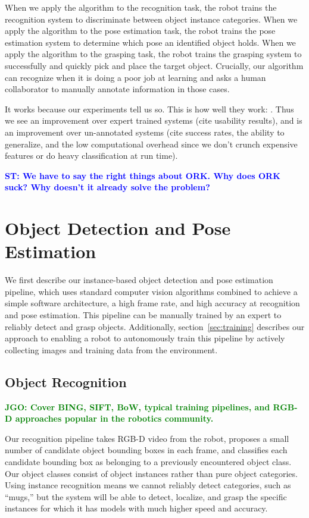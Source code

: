 \documentclass[conference]{IEEEtran}
\newcommand{\stnote}[1]{\textcolor{blue}{\textbf{ST: #1}}}
\newcommand{\jgonote}[1]{\textcolor{green}{\textbf{JGO: #1}}}
\begin{document}
When we apply the algorithm to the recognition task, the robot trains
the recognition system to discriminate between object instance
categories. When we apply the algorithm to the pose estimation task,
the robot trains the pose estimation system to determine which pose an
identified object holds.  When we apply the algorithm to the grasping
task, the robot trains the grasping system to successfully and quickly
pick and place the target object.  Crucially, our algorithm can
recognize when it is doing a poor job at learning and asks a human
collaborator to manually annotate information in those cases.



It works because our experiments tell us so. This is how well they
work: .  Thus we see an improvement over expert trained systems (cite
usability results), and is an improvement over un-annotated systems
(cite success rates, the ability to generalize, and the low
computational overhead since we don't crunch expensive features or do
heavy classification at run time).

\stnote{We have to say the right things about ORK.  Why does ORK suck?
  Why doesn't it already solve the problem?}


\section{Object Detection and Pose Estimation}

We first describe our instance-based object detection and pose
estimation pipeline, which uses standard computer vision algorithms
combined to achieve a simple software architecture, a high frame rate,
and high accuracy at recognition and pose estimation.  This pipeline
can be manually trained by an expert to reliably detect and grasp
objects.  Additionally, section~\ref{sec:training} describes our
approach to enabling a robot to autonomously train this pipeline by
actively collecting images and training data from the environment.

\subsection{Object Recognition}
\jgonote{Cover BING, SIFT, BoW, typical training pipelines, and RGB-D
  approaches popular in the robotics community.} 

Our recognition pipeline takes RGB-D video from the robot, proposes a
small number of candidate object bounding boxes in each frame, and
classifies each candidate bounding box as belonging to a previously
encountered object class. Our object classes consist of object
instances rather than pure object categories.  Using instance
recognition means we cannot reliably detect categories, such as
``mugs,'' but the system will be able to detect, localize, and grasp
the specific instances for which it has models with much higher speed
and accuracy.
\end{document}
